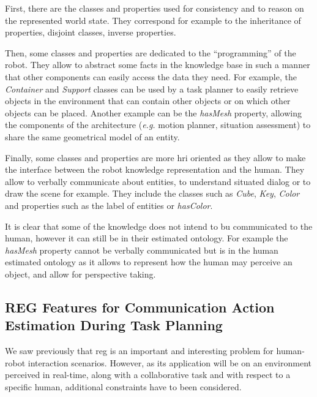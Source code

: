\documentclass[a4paper,11pt,twoside]{StyleThese}
\begin{document}
First, there are the classes and properties used for consistency and to reason on the represented world state. They correspond for example to the inheritance of properties, disjoint classes, inverse properties. 

Then, some classes and properties are dedicated to the ``programming'' of the robot. They allow to abstract some facts in the knowledge base in such a manner that other components can easily access the data they need. For example, the \textit{Container} and \textit{Support} classes can be used by a task planner to easily retrieve objects in the environment that can contain other objects or on which other objects can be placed. Another example can be the \textit{hasMesh} property, allowing the components of the architecture (\textit{e.g.} motion planner, situation assessment) to share the same geometrical model of an entity.

Finally, some classes and properties are more \acrshort{hri} oriented as they allow to make the interface between the robot knowledge representation and the human. They allow to verbally communicate about entities, to understand situated dialog or to draw the scene for example. They include the classes such as \textit{Cube}, \textit{Key}, \textit{Color} and properties such as the label of entities or \textit{hasColor}.

It is clear that some of the knowledge does not intend to bu communicated to the human, however it can still be in their estimated ontology. For example the \textit{hasMesh} property cannot be verbally communicated but is in the human estimated ontology as it allows to represent how the human may perceive an object, and allow for perspective taking.


\subsection{REG Features for Communication Action Estimation During Task Planning}
We saw previously that \acrshort{reg} is an important and interesting problem for human-robot interaction scenarios. However, as its application will be on an environment perceived in real-time, along with a collaborative task and with respect to a specific human, additional constraints have to been considered.
\end{document}
